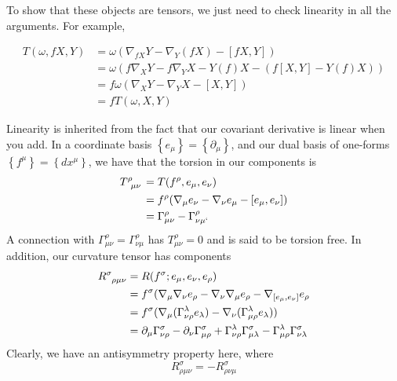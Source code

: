 To show that these objects are tensors, 
we just need to check linearity in all the arguments. 
For example, 

\begin{align*}
	T ( \omega , fX, Y ) &=  \omega ( \nabla _{ f X  } Y - \nabla _ Y ( f X) - [ fX , Y ] )  \\
			     &=  \omega ( f \nabla _ X Y - f \nabla _ Y X - Y ( f) X  - ( f [ X, Y ] - Y ( f ) X ) ) \\
			     &=  f \omega ( \nabla _ X Y - \nabla _ Y X   - [ X , Y ] )   \\
			     &=  f T ( \omega , X, Y ) 
\end{align*}

Linearity is inherited from the fact 
that our covariant derivative is linear when you add. 
In a coordinate basis $ \left\{  e _\mu   \right\}  = \left\{  \partial  _ \mu  \right\}  $, 
and our dual basis of one-forms $ \left\{  f^ \mu \right\}  = \left\{  dx ^ \mu \right\} $, 
we have that the torsion in our components 
is 
\begin{align*}
	T \indices{ ^ \rho _{ \mu \nu } } &=  T ( f ^ \rho, e_ \mu , e _ \nu )  \\
					  &=  f^ \rho ( \nabla _ \mu e _ \nu - \nabla _ \nu e_\mu  - [ e_ \mu , e _ \nu ] )   \\
	&=  \Gamma^ \rho_{ \mu \nu }  - \Gamma ^ \rho _{ \nu \mu ` } 
\end{align*}
A connection with $ \Gamma^ \rho _{ \mu \nu }  = \Gamma ^ \rho _{ \nu \mu } $
has $ T ^ \rho _{ \mu \nu }  = 0 $ and is said to 
be torsion free. 
In addition, our curvature tensor has components 
\begin{align*}
	R \indices{ ^ \sigma _{ \rho \mu \nu }} &=  R ( f ^ \sigma; e_ \mu , e_ \nu , e _ \rho )  \\
						&=  f ^ \sigma ( \nabla _ \mu \nabla _ \nu e _ \rho - 
						\nabla _ \nu \nabla _ \mu e _ \rho 
						- \nabla _{ [ e_ \mu , e _ \nu ] } e _ \rho \\
						&=  f ^ \sigma ( \nabla _ \mu ( \Gamma ^ \lambda _{ \nu \rho } e_{ \lambda } )  - \nabla _ \nu ( \Gamma ^ \lambda _{ \mu \rho } e_{ \lambda  } ) )   \\
						&=  \partial _ \mu \Gamma ^ \sigma _{ \nu \rho } - \partial  _ \nu \Gamma ^ \sigma _{ \mu \rho } + \Gamma ^ \lambda _{ \nu \rho } \Gamma^ \sigma _{ \mu \lambda } 
						 - \Gamma^ \lambda_{ \mu \rho } \Gamma ^ \sigma _{ \nu  \lambda }
\end{align*}
Clearly, we have an antisymmetry property here, 
where \[
 R ^ \sigma _{ \rho \mu \nu } =  - R ^ \sigma _{ \rho \nu \mu } 
\]
